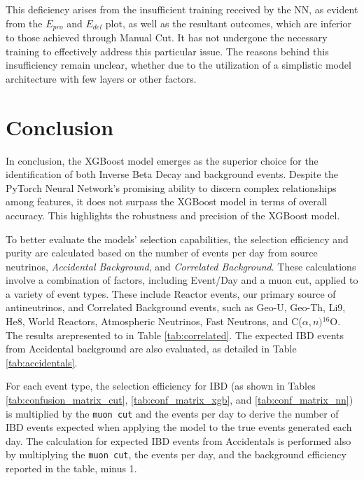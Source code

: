 This deficiency arises from the insufficient training received by the NN, as evident from the $E_{pro}$ and $E_{del}$ plot, as well as the resultant outcomes, which are inferior to those achieved through Manual Cut. It has not undergone the necessary training to effectively address this particular issue. The reasons behind this insufficiency remain unclear, whether due to the utilization of a simplistic model architecture with few layers or other factors.


 
\section{Conclusion}
In conclusion, the XGBoost model emerges as the superior choice for the identification of both Inverse Beta Decay and background events. Despite the PyTorch Neural Network's promising ability to discern complex relationships among features, it does not surpass the XGBoost model in terms of overall accuracy. This highlights the robustness and precision of the XGBoost model.

To better evaluate the models' selection capabilities, the selection efficiency and purity are calculated based on the number of events per day from source neutrinos, \textit{Accidental Background}, and \textit{Correlated Background}. These calculations involve a combination of factors, including Event/Day and a muon cut, applied to a variety of event types. These include Reactor events, our primary source of antineutrinos, and Correlated Background events, such as Geo-U, Geo-Th, Li9, He8, World Reactors, Atmospheric Neutrinos, Fast Neutrons, and $\mathrm{C}$($\alpha,n)$$^{16}\mathrm{O}$. The results arepresented to in Table \ref{tab:correlated}. The expected IBD events from Accidental background are also evaluated, as detailed in Table \ref{tab:accidentals}.

For each event type, the selection efficiency for IBD (as shown in Tables \ref{tab:confusion_matrix_cut}, \ref{tab:conf_matrix_xgb}, and \ref{tab:conf_matrix_nn}) is multiplied by the \texttt{muon cut} and the events per day to derive the number of IBD events expected when applying the model to the true events generated each day. The calculation for expected IBD events from Accidentals is performed also by multiplying the \texttt{muon cut}, the events per day, and the background efficiency reported in the table, minus 1.

